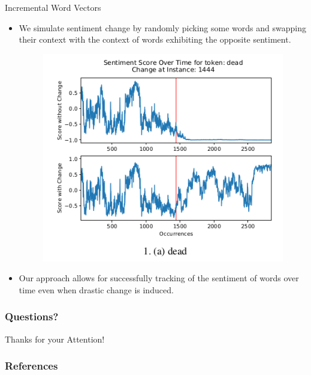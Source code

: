 \documentclass[handout]{beamer}
\begin{document}
\begin{frame}{Incremental Word Vectors}
\begin{scriptsize}
\begin{itemize}
 \item We simulate sentiment change by randomly picking some words and swapping their context with the context of words exhibiting the opposite sentiment.

   \begin{figure}[h]
        	\includegraphics[scale = 0.35]{pics/change.png}
        \end{figure}

 \item Our approach allows for successfully tracking of the sentiment of words over time even when drastic change is induced.

\end{itemize}


\end{scriptsize}
\end{frame}

\begin{frame}
\frametitle{Questions?}
\begin{center}\LARGE Thanks for your Attention!\\ \end{center}



\end{frame}

\begin{frame}[allowframebreaks]\scriptsize
\frametitle{References}


%
\end{frame}  


\end{document}

